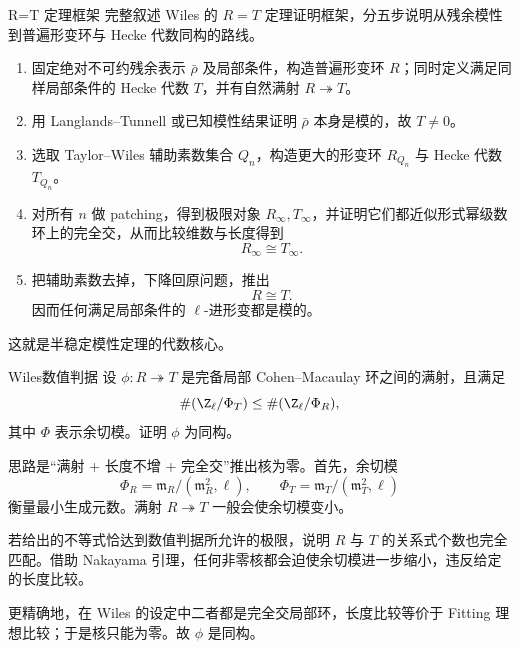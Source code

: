 \begin{problem}{R=T 定理框架}
完整叙述 Wiles 的 $R=T$ 定理证明框架，分五步说明从残余模性到普遍形变环与 Hecke 代数同构的路线。
\end{problem}
\begin{solution}
\begin{enumerate}[label=\textbf{第\arabic*步：}]
  \item 固定绝对不可约残余表示 $\bar\rho$ 及局部条件，构造普遍形变环 $R$；同时定义满足同样局部条件的 Hecke 代数 $T$，并有自然满射 $R\twoheadrightarrow T$。
  \item 用 Langlands--Tunnell 或已知模性结果证明 $\bar\rho$ 本身是模的，故 $T\neq0$。
  \item 选取 Taylor--Wiles 辅助素数集合 $Q_n$，构造更大的形变环 $R_{Q_n}$ 与 Hecke 代数 $T_{Q_n}$。
  \item 对所有 $n$ 做 patching，得到极限对象 $R_\infty,T_\infty$，并证明它们都近似形式幂级数环上的完全交，从而比较维数与长度得到
  \[
  R_\infty\cong T_\infty.
  \]
  \item 把辅助素数去掉，下降回原问题，推出
  \[
  R\cong T.
  \]
  因而任何满足局部条件的 $\ell$-进形变都是模的。
\end{enumerate}
这就是半稳定模性定理的代数核心。
\end{solution}

\begin{problem}{Wiles数值判据}
设 $\phi:R\twoheadrightarrow T$ 是完备局部 Cohen--Macaulay 环之间的满射，且满足
\[
\#(\Z_\ell/\Phi_T)\le \#(\Z_\ell/\Phi_R),
\]
其中 $\Phi$ 表示余切模。证明 $\phi$ 为同构。
\end{problem}
\begin{solution}
思路是“满射 + 长度不增 + 完全交”推出核为零。首先，余切模
\[
\Phi_R=\mathfrak m_R/(\mathfrak m_R^2,\ell),
\qquad
\Phi_T=\mathfrak m_T/(\mathfrak m_T^2,\ell)
\]
衡量最小生成元数。满射 $R\twoheadrightarrow T$ 一般会使余切模变小。

若给出的不等式恰达到数值判据所允许的极限，说明 $R$ 与 $T$ 的关系式个数也完全匹配。借助 Nakayama 引理，任何非零核都会迫使余切模进一步缩小，违反给定的长度比较。

更精确地，在 Wiles 的设定中二者都是完全交局部环，长度比较等价于 Fitting 理想比较；于是核只能为零。故 $\phi$ 是同构。
\end{solution}

